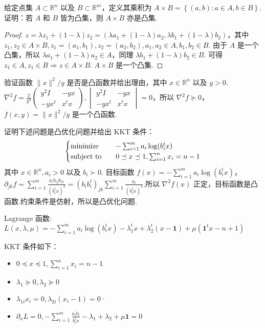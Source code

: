\begin{problem}[问答]
    给定点集 $A\subset \mathbb{R}^n$ 以及 $B \subset \mathbb{R}^m$，定义其乘积为 $A \times B = \left\{(a, b): a \in A, b \in B\right\}$.证明：若 $A$ 和 $B$ 皆为凸集，则 $A \times B$ 亦是凸集.
    \begin{proof}
        $z = \lambda z_1 + (1 - \lambda)z_2 = (\lambda a_1 + (1 - \lambda)a_2, \lambda b_1 + (1 - \lambda)b_2)$，其中 $z_1, z_2 \in A \times B, z_1 = (a_1, b_1), z_2 = (a_2, b_2), a_1, a_2 \in A, b_1, b_2 \in B$. 由于 $A$ 是一个凸集，所以 $\lambda a_1 + (1 - \lambda)a_2 \in A$，同理 $\lambda b_1 + (1 - \lambda)b_2 \in B$. 可得 $z_1 \in A, z_1 \in B \Longrightarrow z \in A\times B$. $A \times B$ 是一个凸集.
    \end{proof}
\end{problem}

\begin{problem}[问答]
    验证函数 $\|x\|^2 / y$ 是否是凸函数并给出理由，其中 $x \in \mathbb{R}^n$ 以及 $y > 0$.
    \Answer $\nabla^2f = \frac{2}{y^3}\begin{pmatrix}
        y^2I & -yx \\
        -yx^t & x^tx
    \end{pmatrix}, \begin{vmatrix}
        y^2I & -yx \\
        -yx^t & x^tx
    \end{vmatrix} = 0$，所以 $\nabla^2f \succeq 0$，$f(x, y) = \|x\|^2 / y$ 是一个凸函数. 
\end{problem}

\begin{problem}[问答]
    证明下述问题是凸优化问题并给出 KKT 条件：\[\begin{cases}
        \operatorname{minimize} \quad &-\sum_{i = 1}^m a_i\log(b_i^tx)\\
        \operatorname{subject\ to} \quad &0 \preceq x \preceq 1, \sum_{i = 1}^nx_i = n - 1
    \end{cases}\] 其中 $x\in \mathbb{R}^n, a_i > 0$ 以及 $b_i \succ 0$.
    \Answer 目标函数 $f(x) = -\sum_{i = 1}^m a_i\log(b_i^tx)$，$\partial_{jk}f = \sum_{i = 1}^m\frac{a_ib_{ij}b_{ik}}{(b_i^tx)^2} = (b_ib_i^t)_{jk}\sum_{i = 1}^m\frac{a_i}{(b_i^tx)^2}$.所以 $\nabla^2f(x)$ 正定，目标函数是凸函数.约束条件是仿射，所以是凸优化问题.

    Lagrange 函数: $L(x, \lambda, \mu) = -\sum_{i = 1}^m a_i\log(b_i^tx) - \lambda_1^t x + \lambda_2^t(x - \mathbf{1}) + \mu(\mathbf{1}^tx - n + 1)$
    
    KKT 条件如下：\begin{itemize}
        \item $0 \preceq x \preceq 1, \sum_{i = 1}^nx_i = n - 1$
        \item $\lambda_1 \succeq 0, \lambda_2 \succeq 0$
        \item $\lambda_{1i}x_i = 0, \lambda_{2i}(x_i - 1) = 0$·
        \item $\partial_xL = 0, -\sum_{i = 1}^m\frac{a_ib_i}{b_i^tx} - \lambda_1 + \lambda_2 + \mu \mathbf{1} = 0$
    \end{itemize}
\end{problem}

